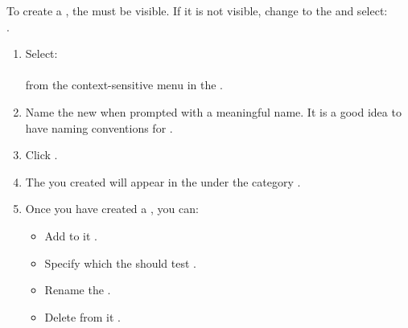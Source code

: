 
To create a \gdjob{}, the \gdtestsuitebrowser{} must be visible.
 If it is not visible, change to the \specpersp{} and select:\\
.

\begin{enumerate}
\item Select:\\
\\
from the context-sensitive menu in the \gdtestsuitebrowser{}. 

\item Name  the new \gdjob{} when prompted with a meaningful name. It is a good idea to have naming conventions for \gdjobs{}. 
\item Click . 
\item The \gdjob{} you created will appear in the \gdtestsuitebrowser{} under the category \bxname{\gdjobs{}}. 
\item Once you have created a \gdjob{}, you can:
\begin{itemize}
\item Add \gdsuites{} to it  .
\item Specify which \gdaut{} the \gdsuites{} should test . 
\item Rename the \gdjob{} .
\item Delete \gdsuites{} from it .
\end{itemize}
\end{enumerate}

